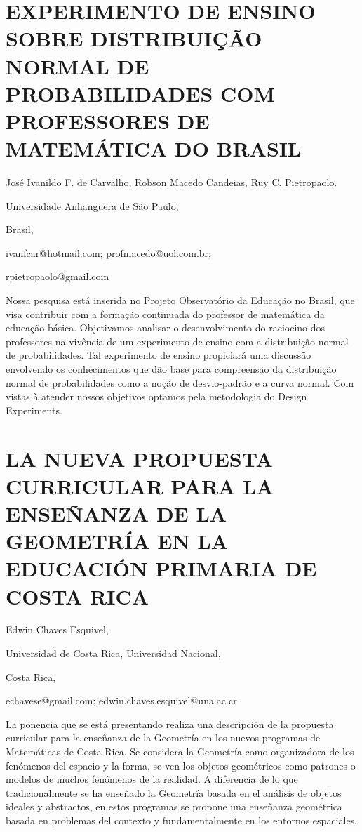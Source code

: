 \section{EXPERIMENTO DE ENSINO SOBRE DISTRIBUIÇÃO NORMAL DE PROBABILIDADES
COM PROFESSORES DE MATEMÁTICA DO BRASIL}

\begin{datos}

José Ivanildo F. de Carvalho, Robson Macedo Candeias, Ruy C. Pietropaolo.

Universidade Anhanguera de São Paulo,

Brasil,

ivanfcar@hotmail.com; profmacedo@uol.com.br; 

rpietropaolo@gmail.com

\end{datos}

Nossa pesquisa está inserida no Projeto Observatório da Educação no
Brasil, que visa contribuir com a formação continuada do professor
de matemática da educação básica. Objetivamos analisar o desenvolvimento
do raciocino dos professores na vivência de um experimento de ensino
com a distribuição normal de probabilidades. Tal experimento de ensino
propiciará uma discussão envolvendo os conhecimentos que dão base
para compreensão da distribuição normal de probabilidades como a noção
de desvio-padrão e a curva normal. Com vistas à atender nossos objetivos
optamos pela metodologia do Design Experiments.


\section{LA NUEVA PROPUESTA CURRICULAR PARA LA ENSEÑANZA DE LA GEOMETRÍA EN
LA EDUCACIÓN PRIMARIA DE COSTA RICA}

\begin{datos}

Edwin Chaves Esquivel,

Universidad de Costa Rica, Universidad Nacional,

Costa Rica,

echavese@gmail.com; edwin.chaves.esquivel@una.ac.cr 

\end{datos}

La ponencia que se está presentando realiza una descripción de la
propuesta curricular para la enseñanza de la Geometría en los nuevos
programas de Matemáticas de Costa Rica. Se considera la Geometría
como organizadora de los fenómenos del espacio y la forma, se ven
los objetos geométricos como patrones o modelos de muchos fenómenos
de la realidad. A diferencia de lo que tradicionalmente se ha enseñado
la Geometría basada en el análisis de objetos ideales y abstractos,
en estos programas se propone una enseñanza geométrica basada en problemas
del contexto y fundamentalmente en los entornos espaciales.


